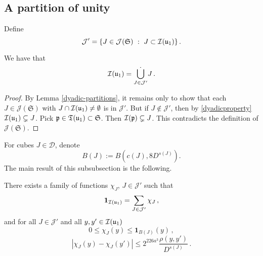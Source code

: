 {\subsection{A partition of unity}
\label{subsubsec-pao}
    Define
    $$
        \mathcal{J}' = \{J \in \mathcal{J}(\mathfrak{S}) \ : \ J \subset {\mathcal{I}}({\mathfrak u}_1)\}\,.
    $$

    \begin{lemma}
        \label{dyadic-partition-1}
        We have that
        $$
            {\mathcal{I}}({\mathfrak u}_1) = \dot{\bigcup_{J \in \mathcal{J}'}} J\,.
        $$
    \end{lemma}

    \begin{proof}
        By Lemma \ref{dyadic-partitions}, it remains only to show that each $J \in \mathcal{J}(\mathfrak{S})$ with $J \cap {\mathcal{I}}({\mathfrak u}_1) \ne \emptyset$ is in $\mathcal{J}'$. But if $J \notin \mathcal{J}'$, then by \eqref{dyadicproperty} ${\mathcal{I}}({\mathfrak u}_1) \subsetneq J$. Pick ${\mathfrak p} \in {\mathfrak T}({\mathfrak u}_1) \subset \mathfrak{S}$.  Then ${\mathcal{I}}({\mathfrak p}) \subsetneq J$. This contradicts the definition of $\mathcal{J}(\mathfrak{S})$.
    \end{proof}

    For cubes $J \in \mathcal{D}$, denote
    \begin{equation}
        \label{def-BJ}
        B(J) := B(c(J), 8D^{s(J)}).
    \end{equation}
    The main result of this subsubsection is the following.

    \begin{lemma}
        \label{Lipschitz-partition-unity}
        There exists a family of functions $\chi_J$, $J \in \mathcal{J}'$ such that \begin{equation}
            \label{eq-pao-1}
            \mathbf{1}_{{\mathcal{I}}({\mathfrak u}_1)} = \sum_{J \in \mathcal{J}'} \chi_J\,,
        \end{equation}
        and for all $J \in \mathcal{J}'$ and all $y,y' \in {\mathcal{I}}({\mathfrak u}_1)$
        \begin{equation}
            \label{eq-pao-2}
            0 \leq \chi_J(y) \leq \mathbf{1}_{B(J)}(y)\,,
        \end{equation}
        \begin{equation}
            \label{eq-pao-3}
            |\chi_J(y) - \chi_J(y')| \le 2^{226a^3}  \frac{\rho(y,y')}{D^{s(J)}}\,.
        \end{equation}
    \end{lemma}

}
